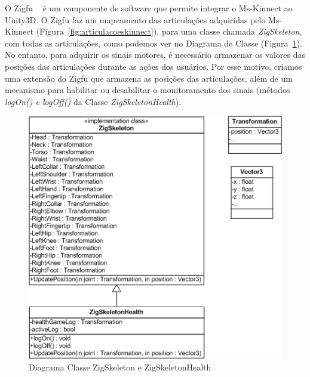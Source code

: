 O Zigfu ~\cite{zigfu} é um componente de software que permite integrar o Ms-Kinnect ao Unity3D. O Zigfu faz um mapeamento das articulações adquiridas pelo Ms-Kinnect (Figura~\ref{fig:articulacoeskinnect}), para uma classe chamada \textit{ZigSkeleton}, com todas as articulações, como podemos ver no Diagrama de Classe (Figura~\ref{fig:diagramaclassezigfu}). No entanto, para adquirir os sinais motores, é necessário armazenar os valores das posições das articulações durante as ações dos usuários. Por esse motivo, criamos uma extensão do Zigfu que armazena as posições das articulações, além de um mecanismo para habilitar ou desabilitar o monitoramento dos sinais (métodos \textit{logOn() e logOff()} da Classe \textit{ZigSkeletonHealth}).

\begin{figure}[!htbp]
 \centering
 \includegraphics[scale=0.8]{./img/diagclasszigfu.png}
 \caption{Diagrama Classe ZigSkeleton e ZigSkeletonHealth}
 \label{fig:diagramaclassezigfu}
\end{figure}
%

